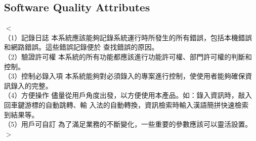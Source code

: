 \documentclass{scrreprt}
\begin{document}
\begin{CJK}{UTF8}{bkai}
\section{Software Quality Attributes}
$<$\\（1）記錄日誌 本系統應該能夠記錄系統運行時所發生的所有錯誤，包括本機錯誤和網路錯誤。這些錯誤記錄便於 查找錯誤的原因。 \\
（2）驗證許可權 本系統的所有功能都應該進行功能許可權、部門許可權的判斷和控制。 \\
（3）控制必錄入項
本系統能夠對必須錄入的專案進行控制，使使用者能夠確保資訊錄入的完整。 \\
（4）方便操作 儘量從用戶角度出發，以方便使用本產品。如：錄入資訊時，敲入回車鍵游標的自動跳轉、輸 入法的自動轉換，資訊檢索時輸入漢語簡拼快速檢索到結果等。 \\
（5）用戶可自訂 為了滿足業務的不斷變化，一些重要的參數應該可以靈活設置。\\
$>$


\end{CJK}
\end{document}
